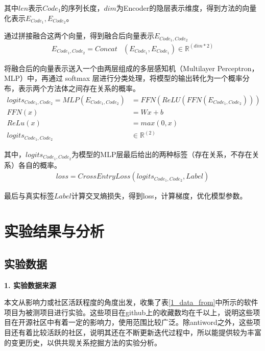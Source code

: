 其中$len$表示$Code_1$的序列长度，$dim$为Encoder的隐层表示维度，得到方法的向量化表示$ E_{Code_1}, E_{Code_2}$。

通过拼接融合这两个向量，得到融合后向量表示$E_{Code_1,Code_2}$
\begin{align}
E_{Code_1,Code_2}=Concat& (E_{Code_1},E_{Code_1})\in \mathbb{R}^{(dim*2)} 
\end{align}

将融合后的向量表示送入一个由两层组成的多层感知机（Multilayer Perceptron，MLP）中，再通过 softmax 层进行分类处理，将模型的输出转化为一个概率分布，表示两个方法体之间存在关系的概率。
\begin{align}
logits_{Code_1,Code_2}=MLP(E_{Code_1,Code_2})&=FFN(ReLU(FFN(E_{Code_1,Code_2}))) \\
FFN(x)&=Wx+b\\
ReLu(x)&=max(0,x)\\
logits_{Code_1,Code_2}& \in \mathbb{R}^{(2)}
\end{align}

其中，$logits_{Code_1,Code_2}$为模型的MLP层最后给出的两种标签（存在关系，不存在关系）各自的概率。
\begin{align}
loss=CrossEntryLoss(logits_{Code_1,Code_2}, Label)
\end{align}

最后与真实标签$Label$计算交叉熵损失，得到loss，计算梯度，优化模型参数。


\section{实验结果与分析}

\subsection{实验数据}

\noindent \textbf{1. 实验数据来源}

本文从影响力或社区活跃程度的角度出发，收集了表\ref{1_data_from}中所示的软件项目为被测项目进行实验。这些项目在github上的收藏数均在千以上，说明这些项目在开源社区中有着一定的影响力，使用范围比较广泛。除antiword之外，这些项目还有着比较活跃的社区，说明其还在不断更新迭代过程中，所以能提供较为丰富的变更历史，以供共现关系挖掘方法的实验分析。

